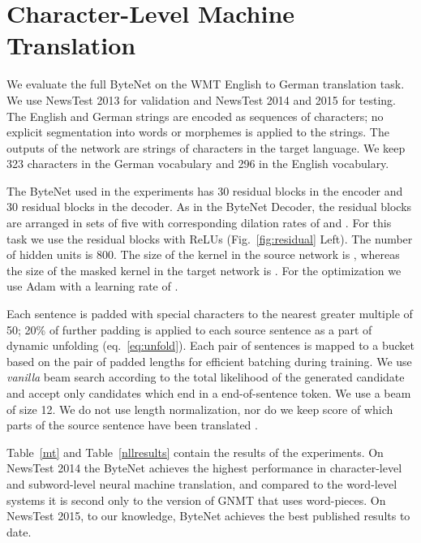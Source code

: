 \documentclass{article}
\newcommand{\figref}[1]{Fig.~\ref{#1}}
\begin{document}
\section{Character-Level Machine Translation}

We evaluate the full ByteNet on the WMT English to German translation task. We use NewsTest 2013 for validation and NewsTest 2014 and 2015 for testing. The English and German strings are encoded as sequences of characters; no explicit segmentation into words or morphemes is applied to the strings. The outputs of the network are strings of characters in the target language. We keep 323 characters in the German vocabulary and 296 in the English vocabulary.


The ByteNet used in the experiments has 30 residual blocks in the encoder and 30 residual blocks in the decoder. As in the ByteNet Decoder, the residual blocks are arranged in sets of five with corresponding dilation rates of  and . For this task we use the residual blocks with ReLUs (\figref{fig:residual} Left). The number of hidden units  is 800. The size of the kernel in the source network is , whereas the size of the masked kernel in the target network is . For the optimization we use Adam with a learning rate of .

Each sentence is padded with special characters to the nearest greater multiple of 50; 20\% of further padding is applied to each source sentence as a part of dynamic unfolding (eq.~\ref{eq:unfold}). Each pair of sentences is mapped to a bucket based on the pair of padded lengths for efficient batching during training. We use \emph{vanilla} beam search according to the total likelihood of the generated candidate and accept only candidates which end in a end-of-sentence token. We use a beam of size 12. We do  not use length normalization, nor do we keep score of which parts of the source sentence have been translated \citep{wu2016}.

Table~\ref{mt} and Table~\ref{nllresults} contain the results of the experiments. On NewsTest 2014 the ByteNet achieves the highest performance in character-level and subword-level neural machine translation, and compared to the word-level systems it is second only to the version of GNMT that uses word-pieces. On NewsTest 2015, to our knowledge, ByteNet achieves the best published results to date.
\end{document}

